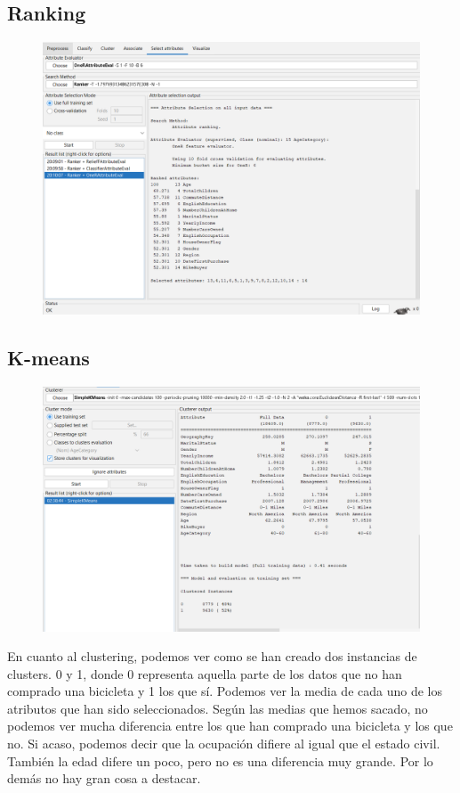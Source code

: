 \documentclass[12pt]{article}
\begin{document}
\subsection{Ranking}

\begin{figure}[h!]
    \centering
    \includegraphics[width=.6\textwidth]{ranking.PNG}
    \label{fig:my_label}
\end{figure}

\clearpage

\subsection{K-means}

\begin{figure}[h!]
    \centering
    \includegraphics[width=.6\textwidth]{K-Means.PNG}
    \label{fig:my_label}
\end{figure}

En cuanto al clustering, podemos ver como se han creado dos instancias de clusters. 0 y 1, donde 0 representa aquella parte de los datos
que no han comprado una bicicleta y 1 los que sí. Podemos ver la media de cada uno de los atributos que han sido seleccionados.
Según las medias que hemos sacado, no podemos ver mucha diferencia entre los que han comprado una bicicleta y los que no. Si acaso,
podemos decir que la ocupación difiere al igual que el estado civil. También la edad difere un poco, pero no es una diferencia muy grande.
Por lo demás no hay gran cosa a destacar.
\end{document}
